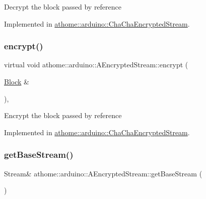 Decrypt the block passed by reference 

Implemented in \mbox{\hyperlink{classathome_1_1arduino_1_1_cha_cha_encrypted_stream_ae0cd8d9dd46060a08789f0c1b221a400}{athome\+::arduino\+::\+Cha\+Cha\+Encrypted\+Stream}}.

\mbox{\label{classathome_1_1arduino_1_1_a_encrypted_stream_a823ec054953b2f239a4bdbbc691ed984}} 
\subsubsection{\texorpdfstring{encrypt()}{encrypt()}}
{\footnotesize\ttfamily virtual void athome\+::arduino\+::\+A\+Encrypted\+Stream\+::encrypt (\begin{DoxyParamCaption}\item[{\mbox{\hyperlink{structathome_1_1arduino_1_1_a_encrypted_stream_1_1_block}{Block}} \&}]{ }\end{DoxyParamCaption})\hspace{0.3cm}{\ttfamily [protected]}, {}}

Encrypt the block passed by reference 

Implemented in \mbox{\hyperlink{classathome_1_1arduino_1_1_cha_cha_encrypted_stream_a34c2613f9f8100c1064f6b6b97a5b0f9}{athome\+::arduino\+::\+Cha\+Cha\+Encrypted\+Stream}}.

\mbox{\label{classathome_1_1arduino_1_1_a_encrypted_stream_aed97c06297924317ac09e82bb583f6b2}} 
\subsubsection{\texorpdfstring{get\+Base\+Stream()}{getBaseStream()}\hspace{0.1cm}{\footnotesize\ttfamily [1/2]}}
{\footnotesize\ttfamily Stream\& athome\+::arduino\+::\+A\+Encrypted\+Stream\+::get\+Base\+Stream (\begin{DoxyParamCaption}{ }\end{DoxyParamCaption})\hspace{0.3cm}{\ttfamily [inline]}}


